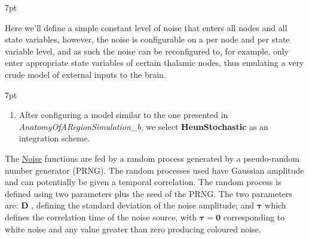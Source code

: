 \documentclass{tufte-handout}
\newenvironment{simulation}{%
  \def\FrameCommand{%
    \hspace{1pt}%
    {\color{ForestGreen}\vrule width 2pt}%
    {\color{simulationshade}\vrule width 4pt}%
    \colorbox{simulationshade}%
  }%
  \MakeFramed{\advance\hsize-\width\FrameRestore}%
  \noindent\hspace{-4.55pt}%
  \begin{adjustwidth}{}{7pt}%
  \vspace{2pt}\vspace{2pt}%
}
{%
  \vspace{2pt}\end{adjustwidth}\endMakeFramed%
}
\newenvironment{blah}{%
  \def\FrameCommand{%
    \hspace{1pt}%
    {\color{DarkOrange}\vrule width 2pt}%
    {\color{PeachPuff}\vrule width 4pt}%
    \colorbox{PeachPuff}%
  }%
  \MakeFramed{\advance\hsize-\width\FrameRestore}%
  \noindent\hspace{-4.55pt}%
  \begin{adjustwidth}{}{7pt}%
  \vspace{2pt}\vspace{2pt}%
}
{%
  \vspace{2pt}\end{adjustwidth}\endMakeFramed%
}
\begin{document}
\begin{blah}
\begin{itemize}
Here we'll define a simple constant level of noise that enters all
nodes and all state variables, however, the noise is configurable on a per
node and per state variable level, and as such the noise can be reconfigured
to, for example, only enter appropriate state variables of certain thalamic
nodes, thus emulating a very crude model of external inputs to the brain. 
\end{itemize}
\end{blah}

\begin{simulation}
\begin{enumerate}
\item After configuring a model similar to the one presented in  \textit{AnatomyOfARegionSimulation\_b}, we select \textbf{HeunStochastic} as an integration scheme.  
\end{enumerate}
\end{simulation}

The \underline{Noise} functions are fed by a
random process generated by a pseudo-random number generator (PRNG). The random
processes used have Gaussian amplitude and can potentially be given a temporal
correlation. The random process is defined using two
parameters plus the seed of the PRNG. The two parameters are: $\mathbf{D}$ , defining the
standard deviation of the noise amplitude; and $\boldsymbol{\tau}$ which defines the
correlation time of the noise source, with $\boldsymbol{\tau = 0}$ corresponding to white
noise and any value greater than zero producing coloured noise. 
\end{document}
